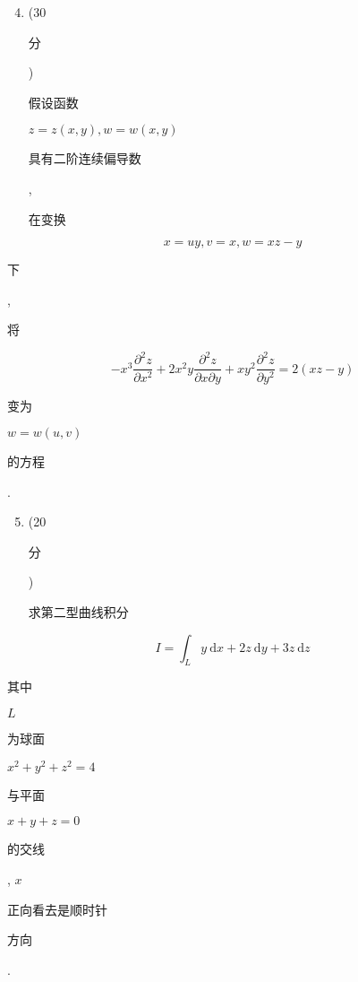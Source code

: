 \documentclass[10pt]{article}
\begin{document}
\begin{enumerate}
  \setcounter{enumi}{3}
  \item (30 \begin{CJK}{UTF8}{mj}分\end{CJK}) \begin{CJK}{UTF8}{mj}假设函数\end{CJK} $z=z(x, y), w=w(x, y)$ \begin{CJK}{UTF8}{mj}具有二阶连续偏导数\end{CJK}, \begin{CJK}{UTF8}{mj}在变换\end{CJK}
\end{enumerate}
$$
x=u y, v=x, w=x z-y
$$
\begin{CJK}{UTF8}{mj}下\end{CJK}, \begin{CJK}{UTF8}{mj}将\end{CJK}
$$
-x^{3} \frac{\partial^{2} z}{\partial x^{2}}+2 x^{2} y \frac{\partial^{2} z}{\partial x \partial y}+x y^{2} \frac{\partial^{2} z}{\partial y^{2}}=2(x z-y)
$$
\begin{CJK}{UTF8}{mj}变为\end{CJK} $w=w(u, v)$ \begin{CJK}{UTF8}{mj}的方程\end{CJK}.

\begin{enumerate}
  \setcounter{enumi}{4}
  \item (20 \begin{CJK}{UTF8}{mj}分\end{CJK}) \begin{CJK}{UTF8}{mj}求第二型曲线积分\end{CJK}
\end{enumerate}
$$
I=\int_{L} y \mathrm{~d} x+2 z \mathrm{~d} y+3 z \mathrm{~d} z
$$
\begin{CJK}{UTF8}{mj}其中\end{CJK} $L$ \begin{CJK}{UTF8}{mj}为球面\end{CJK} $x^{2}+y^{2}+z^{2}=4$ \begin{CJK}{UTF8}{mj}与平面\end{CJK} $x+y+z=0$ \begin{CJK}{UTF8}{mj}的交线\end{CJK}, $x$ \begin{CJK}{UTF8}{mj}正向看去是顺时针\end{CJK} \begin{CJK}{UTF8}{mj}方向\end{CJK}.
\end{document}
